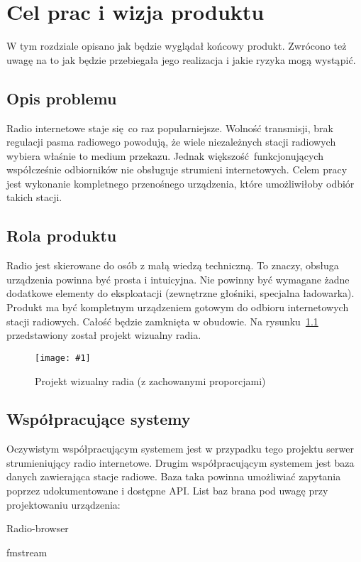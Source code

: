 \documentclass[polish]{aghengthesis}
\author{Norbert Morawski}
\date{\the\year}
\let\tempone\itemize
\let\temptwo\enditemize
\renewenvironment{itemize}{\tempone\setlength{\itemsep}{0cm}}{\temptwo}
\newcommand{\imgint}[4]{
	\begin{figure}[{#4}]
		\centering
		\texttt{[image: \#1]}
		\caption{#2}
		\label{#1}
	\end{figure}
}
\newcommand{\imgh}[3]{\imgint{#1}{#2}{#3}{H}}
\begin{document}
\lstset{inputencoding=utf8, basicstyle=\ttfamily}

\maketitle

\tableofcontents

\chapter{Cel prac i wizja produktu}
	W tym rozdziale opisano jak będzie wyglądał końcowy produkt. Zwrócono też uwagę na to jak będzie przebiegała jego realizacja i jakie ryzyka mogą wystąpić.
	
	\section{Opis problemu}
		Radio internetowe staje się co raz popularniejsze. Wolność transmisji, brak regulacji pasma radiowego powodują, że wiele niezależnych stacji radiowych wybiera właśnie to medium przekazu. Jednak większość funkcjonujących współcześnie odbiorników nie obsługuje strumieni internetowych. Celem pracy jest wykonanie kompletnego przenośnego urządzenia, które umożliwiłoby odbiór takich stacji.
		
	\section{Rola produktu}
		Radio jest skierowane do osób z małą wiedzą techniczną. To znaczy, obsługa urządzenia powinna być prosta i intuicyjna. Nie powinny być wymagane żadne dodatkowe elementy do eksploatacji (zewnętrzne głośniki, specjalna ładowarka). Produkt ma być kompletnym urządzeniem gotowym do odbioru internetowych stacji radiowych. Całość będzie zamknięta w obudowie. Na rysunku~\ref{1/radio_proj_trimmed} przedstawiony został projekt wizualny radia.
		
		\imgh{1/radio_proj_trimmed}{Projekt wizualny radia (z zachowanymi proporcjami)}{0.7}
		
	\section{Współpracujące systemy}
		Oczywistym współpracującym systemem jest w przypadku tego projektu serwer strumieniujący radio internetowe.
		Drugim współpracującym systemem jest baza danych zawierająca stacje radiowe. Baza taka powinna umożliwiać zapytania poprzez udokumentowane i dostępne API. List baz brana pod uwagę przy projektowaniu urządzenia:
		\begin{itemize}
			\item Radio-browser\textsuperscript{\cite{radio-browser}}
			\item fmstream\textsuperscript{\cite{fmstream}}
		\end{itemize}
		
\end{document}
